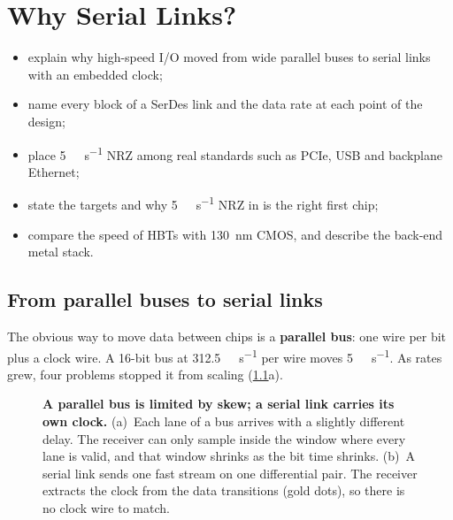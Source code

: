\chapter{Why Serial Links?}\label{ch:intro}

\begin{objectives}
\begin{itemize}
  \item explain why high-speed I/O moved from wide parallel buses to serial links with an embedded clock;
  \item name every block of a SerDes link and the data rate at each point of the \OS{} design;
  \item place \qty{5}{\giga\bit\per\second} NRZ among real standards such as PCIe, USB and backplane Ethernet;
  \item state the \OS{} targets and why \qty{5}{\giga\bit\per\second} NRZ in \sgx{} is the right first chip;
  \item compare the speed of \sgx{} HBTs with \qty{130}{\nano\meter} CMOS, and describe the back-end metal stack.
\end{itemize}
\end{objectives}

\section{From parallel buses to serial links}\label{sec:ch1-parallel}
The obvious way to move data between chips is a \textbf{parallel bus}: one wire per bit plus a clock wire. A 16-bit bus at \qty{312.5}{\mega\bit\per\second} per wire moves \qty{5}{\giga\bit\per\second}. As rates grew, four problems stopped it from scaling (\cref{fig:ch1-parser}a).

\begin{figure}[htbp]
\centering

\caption{\textbf{A parallel bus is limited by skew; a serial link carries its own clock.} (a)~Each lane of a bus arrives with a slightly different delay. The receiver can only sample inside the window where every lane is valid, and that window shrinks as the bit time shrinks. (b)~A serial link sends one fast stream on one differential pair. The receiver extracts the clock from the data transitions (gold dots), so there is no clock wire to match.}
\label{fig:ch1-parser}
\end{figure}

